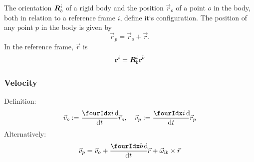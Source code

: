 \documentclass[a4paper, 12pt]{article}
\begin{document}
The orientation \(\bm{R}^i_b\) of a rigid body and the position \(\vec{r}_o\) of a point \(o\) in the body, both in relation to a reference frame \(i\), define it`s configuration. The position of any point \(p\) in the body is given by
\begin{equation}
	\vec{r}_p = \vec{r}_o + \vec{r}.
\end{equation}
In the reference frame, \(\vec{r}\) is
\begin{equation}
	\mathbf{r}^i = \bm{R}^i_b \mathbf{r}^b
\end{equation}

\subsubsection{Velocity}
Definition:
\begin{equation}
	\vec{v}_o := \frac{\presuper{i}\dif}{\dif t} \vec{r}_o, \quad 
	\vec{v}_p := \frac{\presuper{i}\dif}{\dif t} \vec{r}_p
\end{equation}
Alternatively:
\begin{equation}
	\vec{v}_p = \vec{v}_o + \frac{\presuper{b} \dif}{\dif t} \vec{r} + \vec{\omega}_{ib} \times \vec{r}
\end{equation}
\end{document}
